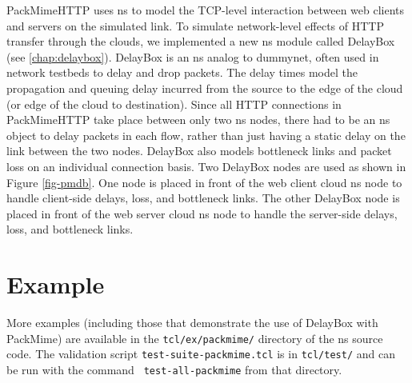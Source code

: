 PackMimeHTTP uses ns to model the TCP-level interaction between web
clients and servers on the simulated link. To simulate network-level
effects of HTTP transfer through the clouds, we implemented a new ns
module called DelayBox (see \ref{chap:delaybox}). DelayBox is an ns
analog to dummynet, often used in network testbeds to delay and drop
packets. The delay times model the propagation and queuing
delay incurred from the source to the edge of the cloud (or edge of the cloud to destination). Since all HTTP connections in PackMimeHTTP take place between
only two ns nodes, there had to be an ns object to delay packets in
each flow, rather than just having a static delay on the link between
the two nodes. DelayBox also models bottleneck links and packet loss
on an individual connection basis. Two DelayBox nodes are used as
shown in Figure \ref{fig-pmdb}. One node is placed in front of the web
client cloud ns node to handle client-side delays, loss, and
bottleneck links. The other DelayBox node is placed in front of the
web server cloud ns node to handle the server-side delays, loss, and
bottleneck links.

\section{Example}
More examples (including those that demonstrate the use of DelayBox
with PackMime) are available in the {\tt tcl/ex/packmime/} directory of the
ns source code.  The validation script {\tt test-suite-packmime.tcl}
is in {\tt tcl/test/} and can be run with the command {\tt
test-all-packmime} from that directory.


